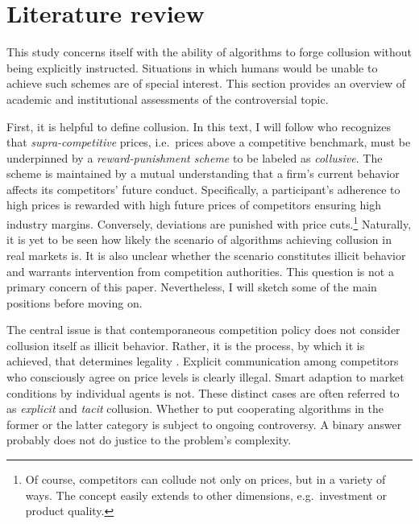 \section{Literature review}\label{literature review}

This study concerns itself with the ability of algorithms to forge collusion without being explicitly instructed. Situations in which  humans would be unable to achieve such schemes are of special interest. This section provides an overview of academic and institutional assessments of the controversial topic.

First, it is helpful to define collusion. In this text, I will follow \textcite[pp.334-336]{harrington_developing_2018} who recognizes that \emph{supra-competitive} prices, i.e.\ prices above a competitive benchmark, must be underpinned by a \emph{reward-punishment scheme} to be labeled as \emph{collusive}. The scheme is maintained by a mutual understanding that a firm's current behavior affects its competitors' future conduct. Specifically, a participant's adherence to high prices is rewarded with high future prices of competitors ensuring high industry margins. Conversely, deviations are punished with price cuts.\footnote{Of course, competitors can collude not only on prices, but in a variety of ways. The concept easily extends to other dimensions, e.g.\ investment or product quality.} Naturally, it is yet to be seen how likely the scenario of algorithms achieving collusion in real markets is. It is also unclear whether the scenario constitutes illicit behavior and warrants intervention from competition authorities. This question is not a primary concern of this paper. Nevertheless, I will sketch some of the main positions before moving on.

The central issue is that contemporaneous competition policy does not consider collusion itself as illicit behavior. Rather, it is the process, by which it is achieved, that determines legality \parencite[p.339-341]{harrington_developing_2018}. Explicit communication among competitors who consciously agree on price levels is clearly illegal. Smart adaption to market conditions by individual agents is not. These distinct cases are often referred to as \emph{explicit} and \emph{tacit} collusion. Whether to put cooperating algorithms in the former or the latter category is subject to ongoing controversy. A binary answer probably does not do justice to the problem's complexity.  

